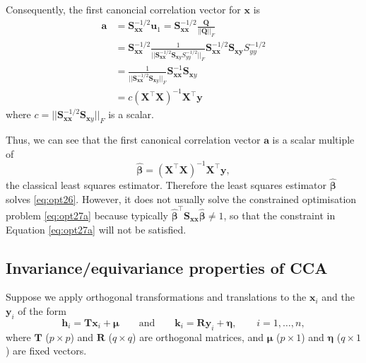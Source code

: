 \documentclass[]{book}
\theoremstyle{definition}
\theoremstyle{definition}
\theoremstyle{definition}
\theoremstyle{remark}
\begin{document}
Consequently, the first canoncial correlation vector for \(\boldsymbol x\) is
\begin{align*}
\boldsymbol a&=\boldsymbol S_{\boldsymbol x\boldsymbol x}^{-1/2}\boldsymbol u_1 =\boldsymbol S_{\boldsymbol x\boldsymbol x}^{-1/2} \frac{\boldsymbol Q}{||\boldsymbol Q||_F}\\
&=\boldsymbol S_{\boldsymbol x\boldsymbol x}^{-1/2} \frac{1}{\vert \vert \boldsymbol S_{\boldsymbol x\boldsymbol x}^{-1/2}\boldsymbol S_{\boldsymbol xy}S_{yy}^{-1/2}\vert \vert_F}\boldsymbol S_{\boldsymbol x\boldsymbol x}^{-1/2}\boldsymbol S_{\boldsymbol x\boldsymbol y}S_{yy}^{-1/2}\\
&=\frac{1}{\vert \vert \boldsymbol S_{\boldsymbol x\boldsymbol x}^{-1/2}\boldsymbol S_{\boldsymbol xy}\vert \vert_F}\boldsymbol S_{\boldsymbol x\boldsymbol x}^{-1}\boldsymbol S_{\boldsymbol xy}\\
&= c (\boldsymbol X^\top \boldsymbol X)^{-1}\boldsymbol X^\top \boldsymbol y
\end{align*}
where \(c = \vert \vert \boldsymbol S_{\boldsymbol x\boldsymbol x}^{-1/2}\boldsymbol S_{\boldsymbol xy}\vert \vert_F\) is a scalar.

Thus, we can see that the first canonical correlation vector \(\boldsymbol a\) is a scalar multiple of
\[
\hat{\pmb \beta}=\left ( \boldsymbol X^\top \boldsymbol X\right )^{-1} \boldsymbol X^\top \boldsymbol y,
\]
the classical least squares estimator. Therefore the least squares estimator \(\hat{\pmb \beta}\) solves \eqref{eq:opt26}. However, it does not usually solve the constrained optimisation problem \eqref{eq:opt27a} because typically \(\hat{\pmb \beta}^\top \boldsymbol S_{\boldsymbol x\boldsymbol x}\hat{\pmb \beta} \not= 1\), so that the constraint in Equation \eqref{eq:opt27a} will not be satisfied.

\hypertarget{invarianceequivariance-properties-of-cca}{%
\subsection{Invariance/equivariance properties of CCA}\label{invarianceequivariance-properties-of-cca}}

Suppose we apply orthogonal transformations and translations to the \(\boldsymbol x_i\) and the \(\boldsymbol y_i\) of the form
\begin{equation}
{\mathbf h}_i={\mathbf T}\boldsymbol x_i + {\pmb \mu} \qquad \text{and} \qquad {\mathbf k}_i={\mathbf R}\boldsymbol y_i +{\pmb \eta},
\qquad i=1,\ldots , n,
\label{eq:transformations}
\end{equation}
where \(\mathbf T\) (\(p \times p\)) and \(\mathbf R\) (\(q \times q\)) are orthogonal matrices, and \(\pmb \mu\) (\(p \times 1\)) and
\(\pmb \eta\) (\(q \times 1\)) are fixed vectors.
\end{document}
